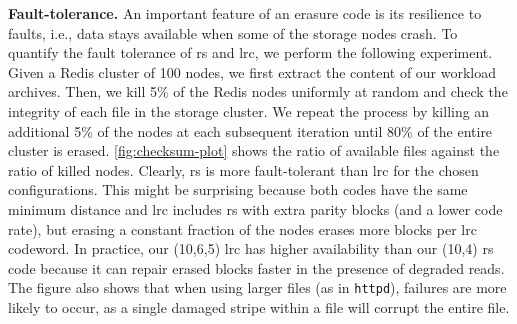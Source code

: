\textbf{Fault-tolerance.}
An important feature of an erasure code is its resilience to faults, i.e., data stays available when some of the storage nodes crash. To quantify the fault tolerance of \ac{rs} and \ac{lrc}, we perform the following experiment. Given a Redis cluster of 100 nodes, we first extract the content of our workload archives. %
Then, we kill 5\% of the Redis nodes uniformly at random and check the integrity of each file in the storage cluster. We repeat the process by killing an additional 5\% of the nodes at each subsequent iteration until 80\% of the entire cluster is erased.
\autoref{fig:checksum-plot} shows the ratio of available files against the ratio of killed nodes.
Clearly, \ac{rs} is more fault-tolerant than \ac{lrc} for the chosen configurations. This might be surprising because both codes have the same minimum distance and \ac{lrc} includes \ac{rs} with extra parity blocks (and a lower code rate), but erasing a constant fraction of the nodes erases  more blocks per \ac{lrc} codeword. In practice, our (10,6,5) \ac{lrc} has higher availability than our (10,4) \ac{rs} code because it can repair erased blocks faster in the presence of degraded reads.  The figure also shows that when using larger files (as in \texttt{httpd}), failures are more likely to occur, as a single damaged stripe within a file will corrupt the entire file.

